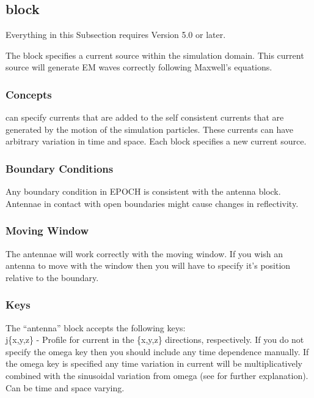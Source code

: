 \subsection{ block}
\label{sec:antenna_block}

{\emphtext
Everything in this Subsection requires {\EPOCH} Version 5.0 or later.}

The  block specifies a current source within the simulation
domain. This current source will generate EM waves correctly following Maxwell's
equations.

\subsubsection{Concepts}

{\EPOCH} can specify currents that are added to the self consistent currents
that are generated by the motion of the simulation particles. These currents
can have arbitrary variation in time and space. Each  block
specifies a new current source.

\subsubsection{Boundary Conditions}

Any boundary condition in EPOCH is consistent with the antenna block. Antennae
in contact with open boundaries might cause changes in reflectivity.

\subsubsection{Moving Window}

The antennae will work correctly with the moving window. If you wish an antenna
to move with the window then you will have to specify it's position relative to
the  boundary.

\subsubsection{Keys}

The ``antenna'' block accepts the following keys:\\

{\emphtext j\{x,y,z\}} -  Profile for current in the \{x,y,z\} directions,
  respectively. If you do not specify the omega key then you should include any
  time dependence manually. If the omega key is specified any time variation in
  current will be multiplicatively combined with the sinusoidal variation from
  omega (see  for further explanation). Can be time and
  space varying.\\

